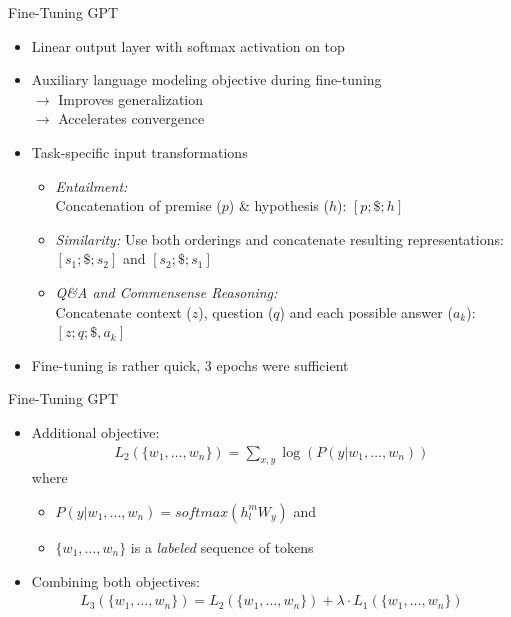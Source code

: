 
\begin{frame}{Fine-Tuning GPT}

\vfill
			
\begin{itemize}
		\item Linear output layer with softmax activation on top
		\item Auxiliary language modeling objective during fine-tuning\\
					$\rightarrow$ Improves generalization\\
					$\rightarrow$ Accelerates convergence
		\item Task-specific input transformations
					\begin{itemize}
						\item \textit{Entailment:} \\ Concatenation of premise ($p$) \& hypothesis ($h$): $[p; \$; h]$
						\item \textit{Similarity:} Use both orderings and concatenate resulting representations: $[s_1; \$; s_2]$ and $[s_2; \$; s_1]$
						\item \textit{Q\&A and Commensense Reasoning:} \\ Concatenate context ($z$), question ($q$) and each possible answer ($a_k$): $[z; q; \$, a_k]$
					\end{itemize}
		\item Fine-tuning is rather quick, 3 epochs were sufficient
\end{itemize}

\vfill

\end{frame}


\begin{frame}{Fine-Tuning GPT}

\vfill

\begin{itemize}
		\item Additional objective:
					\begin{align*}
						L_2(\{w_1, \hdots, w_n\}) = \sum_{x,y} \log(P(y | w_1, \hdots, w_n))
					\end{align*}		
					where 
				\begin{itemize}
					\item $P(y | w_1, \hdots, w_n) = softmax(h_l^m W_y)$ and 
					\item $\{w_1, \hdots, w_n\}$ is a \textit{labeled} sequence of tokens
				\end{itemize}
		\item Combining both objectives: 
					\begin{align*}
						L_3(\{w_1, \hdots, w_n\}) = L_2(\{w_1, \hdots, w_n\}) + \lambda \cdot L_1(\{w_1, \hdots, w_n\})
					\end{align*}
\end{itemize}

\vfill

\end{frame}

